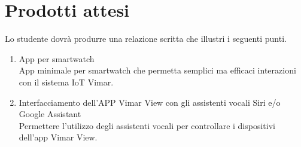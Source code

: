 \section*{Prodotti attesi}
Lo studente dovrà produrre una relazione scritta che illustri i seguenti punti.
\begin{enumerate}
    \item App per smartwatch \\
    App minimale per smartwatch che permetta semplici ma efficaci interazioni con il sistema IoT Vimar. 
    
    \item Interfacciamento dell’APP Vimar View con gli assistenti vocali Siri e/o Google Assistant \\
    Permettere l'utilizzo degli assistenti vocali per controllare i dispositivi dell'app Vimar View.
\end{enumerate}

